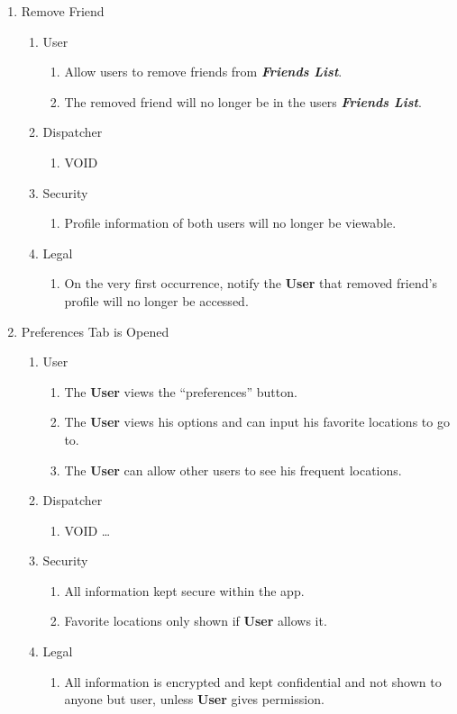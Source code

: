 \documentclass[english]{article}
\begin{document}
\begin{enumerate}[{BE}1.]
	\item Remove Friend
	\begin{enumerate}[{VP9}.1]
		\item User
			\begin{enumerate}
				\item Allow users to remove friends from \textbf{\emph{Friends List}}.
				\item The removed friend will no longer be in the users \textbf{\emph{Friends List}}.
			\end{enumerate}
		\item Dispatcher
			\begin{enumerate}
				\item VOID
			\end{enumerate}
		\item Security
			\begin{enumerate}
				\item Profile information of both users will no longer be viewable.
			\end{enumerate}
		\item Legal
			\begin{enumerate}
				\item On the very first occurrence, notify the \textbf{User} that removed friend's profile will no longer be accessed.
			\end{enumerate}
	\end{enumerate}
	
	\item Preferences Tab is Opened
	\begin{enumerate}[{VP10}.1]
		\item User
		\begin{enumerate}
			\item The \textbf{User} views the “preferences” button.
			\item The \textbf{User} views his options and can input his favorite locations to go to.
			\item The \textbf{User} can allow other users to see his frequent locations.
		\end{enumerate}
		\item Dispatcher
		\begin{enumerate}
			\item VOID
			 \dots
		\end{enumerate}
		\item Security
		\begin{enumerate}
			\item All information kept secure within the app.
			\item Favorite locations only shown if \textbf{User} allows it.
		\end{enumerate}
		\item Legal
		\begin{enumerate}
			\item All information is encrypted and kept confidential and not shown to anyone but user, unless \textbf{User} gives permission.
		\end{enumerate}
	\end{enumerate}
	

\end{enumerate}
\end{document}
